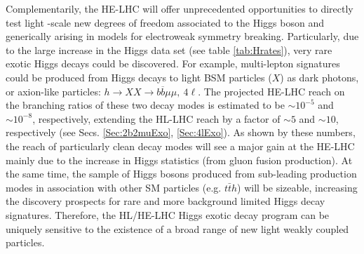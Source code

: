 \documentclass[../report.tex]{subfiles}
\begin{document}
Complementarily, the HE-LHC will offer unprecedented opportunities to directly test light \UTeV-scale new degrees of freedom associated to the Higgs boson and generically arising in models for electroweak symmetry breaking. 
Particularly, due to the large increase in the Higgs data set (see table \ref{tab:Hrates}), very rare exotic Higgs decays could be discovered.
For example, multi-lepton signatures could be produced from Higgs decays to light BSM particles ($X$) as dark photons, or axion-like particles: $h \rightarrow XX \rightarrow b\overline{b}\mu\mu,~4\ell$. The projected HE-LHC reach on the branching ratios of these two decay modes is estimated to be $\sim10^{-5}$ and $\sim10^{-8}$, respectively, extending the HL-LHC reach by a factor of $\sim5$ and $\sim10$, respectively (see Secs. \ref{Sec:2b2muExo}, \ref{Sec:4lExo}). As shown by these numbers, the reach of particularly clean decay modes will see a major gain at the HE-LHC mainly due to the increase in Higgs statistics (from gluon fusion production). %
At the same time, the sample of Higgs bosons produced from sub-leading production
modes in association with other SM particles (e.g. $t\bar th$) will be sizeable, increasing the discovery prospects for rare and more background limited Higgs decay signatures. Therefore, the HL/HE-LHC
Higgs exotic decay program can be uniquely sensitive to the existence of a broad range of new light
weakly coupled particles.
\end{document}
